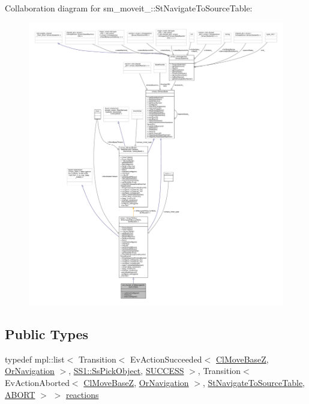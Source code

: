 Collaboration diagram for sm\+\_\+moveit\+\_\+:\+:St\+Navigate\+To\+Source\+Table\+:
\nopagebreak
\begin{figure}[H]
\begin{center}
\leavevmode
\includegraphics[width=350pt]{structsm__moveit__4_1_1StNavigateToSourceTable__coll__graph}
\end{center}
\end{figure}
\subsection*{Public Types}
\begin{DoxyCompactItemize}
\item 
typedef mpl\+::list$<$ Transition$<$ Ev\+Action\+Succeeded$<$ \hyperlink{classcl__move__base__z_1_1ClMoveBaseZ}{Cl\+Move\+BaseZ}, \hyperlink{classsm__moveit__4_1_1OrNavigation}{Or\+Navigation} $>$, \hyperlink{structsm__moveit__4_1_1SS1_1_1SsPickObject}{S\+S1\+::\+Ss\+Pick\+Object}, \hyperlink{classSUCCESS}{S\+U\+C\+C\+E\+SS} $>$, Transition$<$ Ev\+Action\+Aborted$<$ \hyperlink{classcl__move__base__z_1_1ClMoveBaseZ}{Cl\+Move\+BaseZ}, \hyperlink{classsm__moveit__4_1_1OrNavigation}{Or\+Navigation} $>$, \hyperlink{structsm__moveit__4_1_1StNavigateToSourceTable}{St\+Navigate\+To\+Source\+Table}, \hyperlink{classABORT}{A\+B\+O\+RT} $>$ $>$ \hyperlink{structsm__moveit__4_1_1StNavigateToSourceTable_a83fbcaf1bf1abdbcac936c6c3201893d}{reactions}
\end{DoxyCompactItemize}
